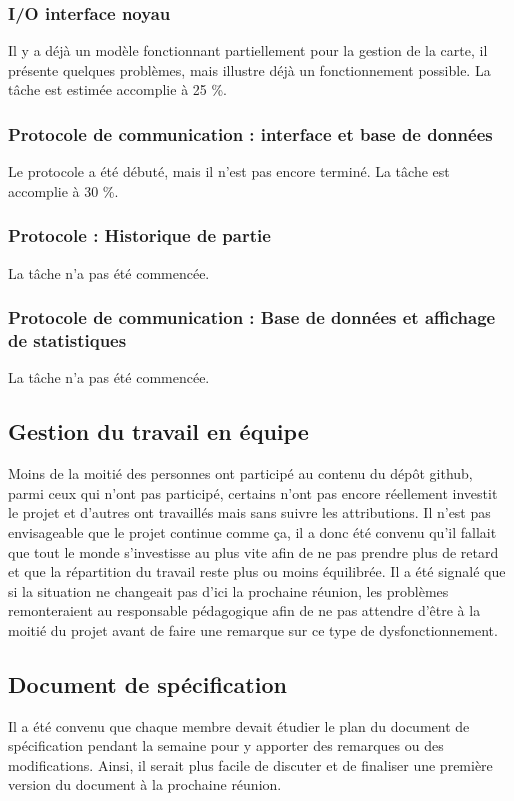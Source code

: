 \documentclass{article}
\begin{document}
\subsubsection*{I/O interface noyau}
Il y a déjà un modèle fonctionnant partiellement pour la gestion de la carte, il présente quelques problèmes, mais illustre déjà un fonctionnement possible. La tâche est estimée accomplie à 25 \%.

\subsubsection*{Protocole de communication : interface et base de données}
Le protocole a été débuté, mais il n'est pas encore terminé. La tâche est accomplie à 30 \%.

\subsubsection*{Protocole : Historique de partie}
La tâche n'a pas été commencée.

\subsubsection*{Protocole de communication : Base de données et affichage de statistiques}
La tâche n'a pas été commencée.

\subsection*{Gestion du travail en équipe}

Moins de la moitié des personnes ont participé au contenu du dépôt github, parmi ceux qui n'ont pas participé, certains n'ont pas encore réellement investit le projet et d'autres ont travaillés mais sans suivre les attributions. Il n'est pas envisageable que le projet continue comme ça, il a donc été convenu qu'il fallait que tout le monde s'investisse au plus vite afin de ne pas prendre plus de retard et que la répartition du travail reste plus ou moins équilibrée. Il a été signalé que si la situation ne changeait pas d'ici la prochaine réunion, les problèmes remonteraient au responsable pédagogique afin de ne pas attendre d'être à la moitié du projet avant de faire une remarque sur ce type de dysfonctionnement.

\subsection*{Document de spécification}
Il a été convenu que chaque membre devait étudier le plan du document de spécification pendant la semaine pour y apporter des remarques ou des modifications. Ainsi, il serait plus facile de discuter et de finaliser une première version du document à la prochaine réunion.
\end{document}
